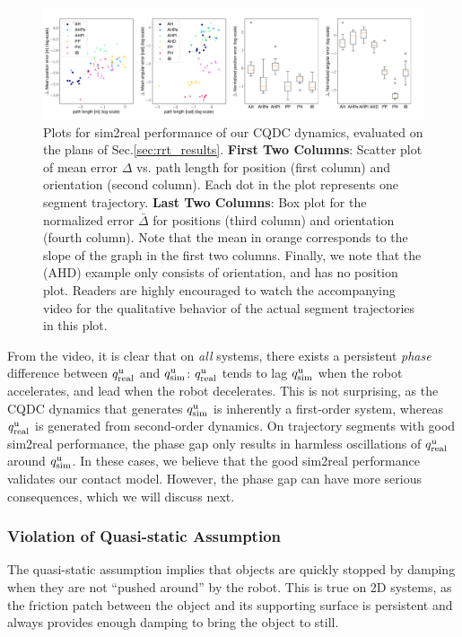 \begin{figure}[thpb]
\centering\includegraphics[width = 1.0\linewidth]{figures/03_contact_rich_planning/sim_to_real.pdf}
\caption{Plots for sim2real performance of our CQDC dynamics, evaluated on the plans of Sec.\ref{sec:rrt_results}. \textbf{First Two Columns}: Scatter plot of mean error $\Delta$ vs. path length for position (first column) and orientation (second column). Each dot in the plot represents one segment trajectory. \textbf{Last Two Columns}: Box plot for the normalized error $\bar{\Delta}$ for positions (third column) and orientation (fourth column). Note that the mean in orange corresponds to the slope of the graph in the first two columns. Finally, we note that the  (AHD) example only consists of orientation, and has no position plot. Readers are highly encouraged to watch the accompanying video for the qualitative behavior of the actual segment trajectories in this plot.}
\label{fig:sim_to_real}
\end{figure}

From the video, it is clear that on \emph{all} systems, there exists a persistent \emph{phase} difference between $q^\mathrm{u}_{\mathrm{real}}$ and $q^\mathrm{u}_{\mathrm{sim}}$: $q^\mathrm{u}_{\mathrm{real}}$ tends to lag $q^\mathrm{u}_{\mathrm{sim}}$ when the robot accelerates, and lead when the robot decelerates. This is not surprising, as the CQDC dynamics that generates $q^\mathrm{u}_{\mathrm{sim}}$ is inherently a first-order system, whereas $q^\mathrm{u}_{\mathrm{real}}$ is generated from second-order dynamics. 
On trajectory segments with good sim2real performance, the phase gap only results in harmless oscillations of $q^\mathrm{u}_{\mathrm{real}}$ around $q^\mathrm{u}_{\mathrm{sim}}$. In these cases, we believe that the good sim2real performance validates our contact model. 
However, the phase gap can have more serious consequences, which we will discuss next.


\subsubsection{Violation of Quasi-static Assumption} 
The quasi-static assumption implies that objects are quickly stopped by damping when they are not ``pushed around'' by the robot. This is true on 2D systems, as the friction patch between the object and its supporting surface is persistent and always provides enough damping to bring the object to still. 

